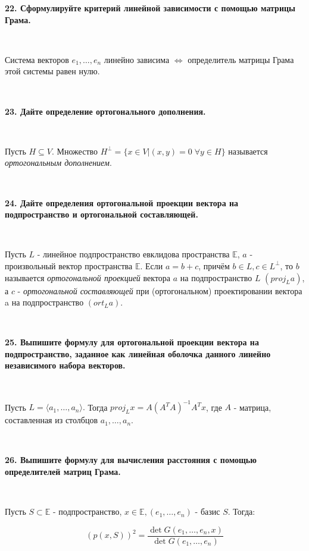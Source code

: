 \documentclass{article}
\begin{document}
	\textbf{22. Сформулируйте критерий линейной зависимости с помощью матрицы Грама.}
	
	$\;$
	{
		\setlength{\parindent}{0.4cm}
		\hangindent=0.4cm
		
		Система векторов $e_1, \dots, e_n$
		линейно зависима $\Leftrightarrow$ определитель матрицы Грама этой системы равен нулю.
		
		$\;$
		\setlength{\parindent}{0cm}
		\hangindent=0cm
	}


	\textbf{23. Дайте определение ортогонального дополнения.}
	
	$\;$
	{
		\setlength{\parindent}{0.4cm}
		\hangindent=0.4cm
		
		Пусть $H \subseteq V$. Множество $H^\perp=\{x\in V | (x,y)=0 \; \forall y \in H\}$ называется \textit{ортогональным дополнением}.
		
		$\;$
		\setlength{\parindent}{0cm}
		\hangindent=0cm
	}
	
	\textbf{24. Дайте определения ортогональной проекции вектора на подпространство и ортогональной составляющей.}
	
	{
		$\;$
		\setlength{\parindent}{0.4cm}
		\hangindent=0.4cm
		
		Пусть $L$ - линейное подпространство евклидова пространства
		$\mathbb{E}$, $a$ - произвольный вектор пространства $\mathbb{E}$. Если $a = b + c$, причём $b \in L, c \in L ^ \perp$, то $b$ называется \textit{ортогональной проекцией} вектора $a$ на
		подпространство $L$ $(proj_La)$, а $c$ - \textit{ортогональной составляющей} при (ортогональном) проектировании вектора a на подпространство $(ort_La)$.
		
		$\;$
		\setlength{\parindent}{0cm}
		\hangindent=0cm
	}
	
	\textbf{25. Выпишите формулу для ортогональной проекции вектора на подпространство, заданное как линейная оболочка данного линейно независимого набора векторов.}
	
	{
		$\;$
		\setlength{\parindent}{0.4cm}
		\hangindent=0.4cm
		
		Пусть $L=\langle a_1, \dots, a_n \rangle.$ Тогда $proj_L x=A(A^T A)^{-1}A^Tx$, где $A$ - матрица, составленная из столбцов $a_1, \dots, a_n$.
			
		$\;$
		\setlength{\parindent}{0cm}
		\hangindent=0cm
	}

	\textbf{26. Выпишите формулу для вычисления расстояния с помощью определителей матриц Грама.}
	
	{
		$\;$
		\setlength{\parindent}{0.4cm}
		\hangindent=0.4cm
		
		Пусть $S \subset \mathbb{E}$ - подпространство, $x \in \mathbb{E}, (e_1, \dots, e_n)$ - базис $S$. Тогда:
		
		$$
		(p(x, S))^2 = \frac{\det G(e_1,\dots, e_n, x)}{\det G(e_1, \dots, e_n)}
		$$
		
		$\;$
		\setlength{\parindent}{0cm}
		\hangindent=0cm
	}
	
\end{document}
